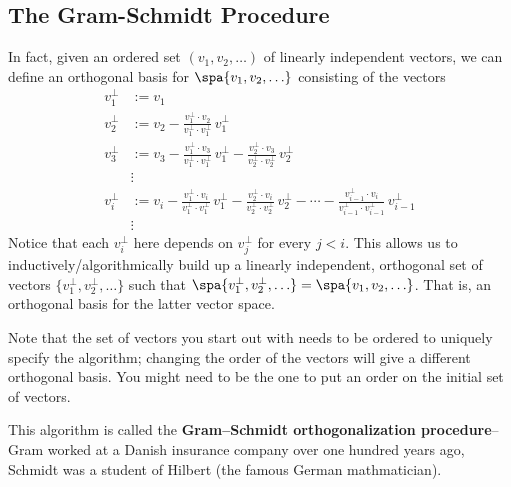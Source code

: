 \subsection{The Gram-Schmidt Procedure}
In fact, given an ordered set $(v_1, v_2, \ldots )$ of linearly independent vectors, we can define an orthogonal basis for $\spa \{v_1,v_2, \ldots \}$ consisting of the  vectors
\begin{align*}
v_1^\perp&:=v_1 \\
v_2^\perp &:= v_2 - \frac{v_1^\perp\cdot v_2}{v_1^\perp\cdot v_1^\perp}\,v_1^\perp \\
v_3^\perp &:= v_3 - \frac{v_1^\perp\cdot v_3}{v_1^\perp\cdot v_1^\perp}\,v_1^\perp - \frac{v_2^\perp\cdot v_3}{v_2^\perp\cdot v_2^\perp}\,v_2^\perp\\
&\vdots \\
v_i^\perp%
 &:= v_i - \frac{v_1^\perp\cdot v_i}{v_1^\perp\cdot v_1^\perp}\,v_1^\perp   
 - \frac{v_2^\perp\cdot v_i}{v_2^\perp\cdot v_2^\perp}\,v_2^\perp -\cdots
 - \frac{v_{i-1}^\perp\cdot v_i}{v_{i-1}^\perp\cdot v_{i-1}^\perp}\,v_{i-1}^\perp\\
&\vdots
\end{align*}
Notice that each $v_i^\perp$ here depends on  $v_j^\perp$ for every $j<i$.  This allows us to inductively/algorithmically build up a linearly independent, orthogonal set of vectors 
$\{v_1^\perp,v_2^\perp, \ldots \}$ 
such that 
$\spa \{v_1^\perp,v_2^\perp, \ldots \}=\spa \{v_1, v_2, \ldots \}$. 
That is, an orthogonal basis for the latter vector space. 

Note that the set of vectors you start out with needs to be ordered to uniquely specify the algorithm; changing the order of the vectors will give a different orthogonal basis. You might need to be the one to put an order on the initial set of vectors.

This algorithm is called the {\bfseries Gram--Schmidt orthogonalization procedure}\label{GramSchmidt}--Gram worked at a Danish insurance company over one hundred years ago, Schmidt was a student of Hilbert (the famous German mathmatician).

